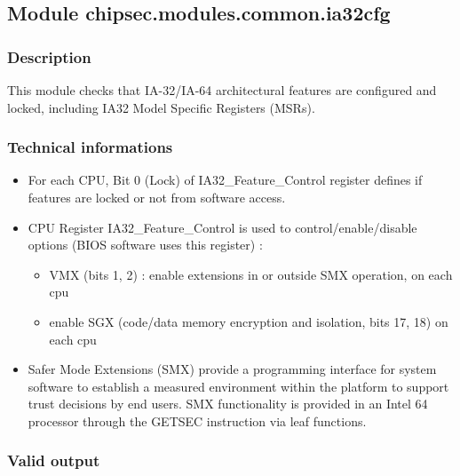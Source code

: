 \hypertarget{module-chipsec.modules.common.ia32cfg}{%
\subsection{Module
chipsec.modules.common.ia32cfg}\label{module-chipsec.modules.common.ia32cfg}}

\hypertarget{description-2}{%
\subsubsection{Description}\label{description-2}}

This module checks that IA-32/IA-64 architectural features are
configured and locked, including IA32 Model Specific Registers (MSRs).

\hypertarget{technical-informations-2}{%
\subsubsection{Technical informations}\label{technical-informations-2}}

\begin{itemize}
\tightlist
\item
  For each CPU, Bit 0 (Lock) of IA32\_Feature\_Control register defines
  if features are locked or not from software access.
\item
  CPU Register IA32\_Feature\_Control is used to control/enable/disable
  options (BIOS software uses this register) :

  \begin{itemize}
  \tightlist
  \item
    VMX (bits 1, 2) : enable extensions in or outside SMX operation, on
    each cpu
  \item
    enable SGX (code/data memory encryption and isolation, bits 17, 18)
    on each cpu
  \end{itemize}
\item
  Safer Mode Extensions (SMX) provide a programming interface for system
  software to establish a measured environment within the platform to
  support trust decisions by end users. SMX functionality is provided in
  an Intel 64 processor through the GETSEC instruction via leaf
  functions.
\end{itemize}

\hypertarget{valid-output-2}{%
\subsubsection{Valid output}\label{valid-output-2}}

